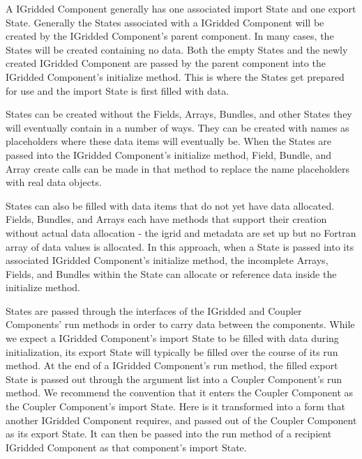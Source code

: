 %


A IGridded Component generally has one associated import 
State and one export State.  Generally the States 
associated with a IGridded Component will be created by 
the IGridded Component's parent component.
In many cases, the States will be created containing 
no data.  Both the empty States and the
newly created IGridded Component are passed
by the parent component into the IGridded Component's initialize 
method.  This is where the States get prepared for use 
and the import State is first filled with data.

States can be created without the Fields, Arrays, Bundles,
and other States they will eventually contain in a number 
of ways.  They can be created with names as placeholders where 
these data items will eventually be.  When the States are passed 
into the IGridded Component's initialize method, Field,
Bundle, and Array create calls can be made in that method
to replace the name placeholders with real data objects.

States can also be filled with data items that do not yet 
have data allocated.  Fields, Bundles, and Arrays each have 
methods that support their creation without actual data 
allocation - the igrid and metadata are set up but no
Fortran array of data values is allocated.  In this approach, 
when a State is passed into its associated IGridded Component's 
initialize method, the incomplete Arrays, Fields, and 
Bundles within the State can allocate or reference data 
inside the initialize method.

States are passed through the interfaces of the IGridded 
and Coupler Components' run methods in order to carry data 
between the components.  While we expect
a IGridded Component's import State to be filled with data 
during initialization, its export State will typically be
filled over the course of its run method.  At the end of
a IGridded Component's run method, the filled export State 
is passed out through the argument list into a Coupler 
Component's run method.  We recommend the convention that 
it enters the Coupler Component as the Coupler Component's
import State.  Here is it transformed into a form
that another IGridded Component requires, and passed out
of the Coupler Component as its export State.  It can then
be passed into the run method of a recipient IGridded Component
as that component's import State.

